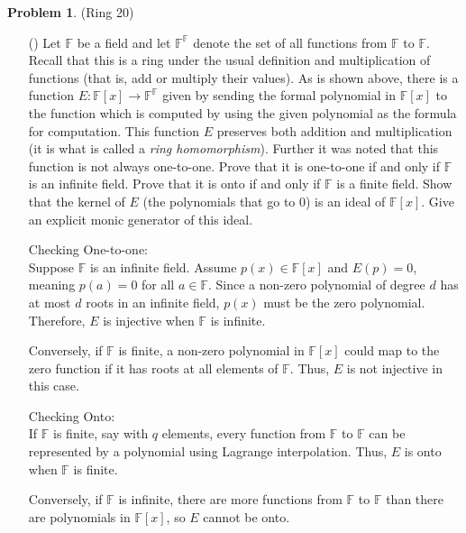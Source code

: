 \documentclass[12pt]{article}
\theoremstyle{definition}
\newtheorem{problem}{Problem}
\newcounter{subq}[problem]
\newenvironment{subproblem}
{\refstepcounter{subq} \begin{itemize} \item[(\alph{subq})]}
{\end{itemize} \medskip}
\begin{document}
\begin{problem} (Ring 20)

    \begin{subproblem}
        Let $\mathbb{F}$ be a field and let $\mathbb{F}^\mathbb{F}$ denote the set of all functions from $\mathbb{F}$ to $\mathbb{F}$.
        Recall that this is a ring under the usual definition and multiplication of functions (that is, add or multiply their values).
        As is shown above, there is a function $E: \mathbb{F}[x] \longrightarrow \mathbb{F}^{\mathbb{F}}$ given by sending the formal
        polynomial in $\mathbb{F}[x]$ to the function which is computed by using the given polynomial as the formula for computation.
        This function $E$ preserves both addition and multiplication (it is what is called a \textit{ring homomorphism}). Further 
        it was noted that this function is not always one-to-one. Prove that it is one-to-one if and only if $\mathbb{F}$ is an 
        infinite field. Prove that it is onto if and only if $\mathbb{F}$ is a finite field. Show that the kernel of $E$ (the polynomials
        that go to 0) is an ideal of $\mathbb{F}[x]$. Give an explicit monic generator of this ideal.

        \begin{solution}
            Checking One-to-one:\\
            Suppose \( \mathbb{F} \) is an infinite field. Assume \( p(x) \in \mathbb{F}[x] \) and \( E(p) = 0 \), meaning \( p(a) = 0 \) for all \( a \in \mathbb{F} \). Since a non-zero polynomial of degree \( d \) has at most \( d \) roots in an infinite field, \( p(x) \) must be the zero polynomial. Therefore, \( E \) is injective when \( \mathbb{F} \) is infinite.

            Conversely, if \( \mathbb{F} \) is finite, a non-zero polynomial in \( \mathbb{F}[x] \) could map to the zero function if it has roots at all elements of \( \mathbb{F} \). Thus, \( E \) is not injective in this case.

            Checking Onto:\\
            If \( \mathbb{F} \) is finite, say with \( q \) elements, every function from \( \mathbb{F} \) to \( \mathbb{F} \) can be represented by a polynomial using Lagrange interpolation. Thus, \( E \) is onto when \( \mathbb{F} \) is finite.

            Conversely, if \( \mathbb{F} \) is infinite, there are more functions from \( \mathbb{F} \) to \( \mathbb{F} \) than there are polynomials in \( \mathbb{F}[x] \), so \( E \) cannot be onto.


\end{solution}
\end{subproblem}
\end{problem}
\end{document}
